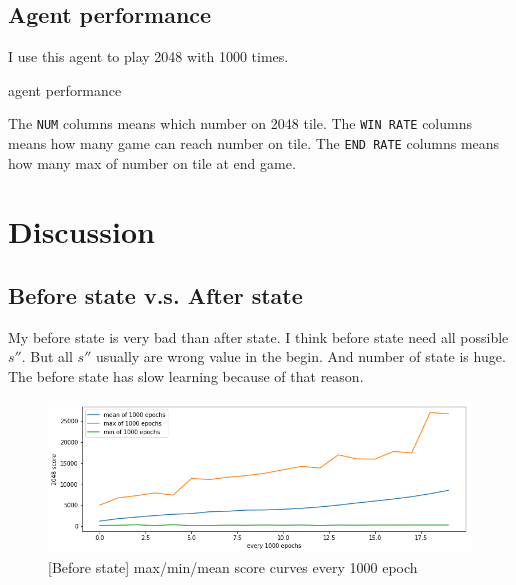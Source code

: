 \documentclass[12pt]{article}
\begin{document}
\subsection{Agent performance}

I use this agent to play 2048 with 1000 times.

\begin{table}[H]
    \centering
    \caption{agent performance}
    \label{tab:my_label}
\end{table}

The \verb|NUM| columns means which number on 2048 tile. The \verb|WIN RATE| columns means how many game can reach number on tile. The \verb|END RATE| columns means how many max of number on tile at end game.

\section{Discussion}

\subsection{Before state v.s. After state}

My before state is very bad than after state. I think before state need all possible $s''$. But all $s''$ usually are wrong value in the begin. And number of state is huge. The before state has slow learning because of that reason.

\begin{figure}[H]
\centering
\includegraphics[width=\linewidth]{Images/beforescorecurve.png}
\caption{ [Before state] max/min/mean score curves every 1000 epoch}
\end{figure}

 
\end{document}
